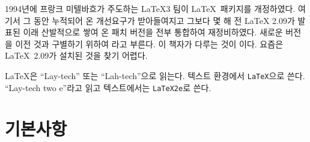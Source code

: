   1994년에 프랑크 미텔바흐가 주도하는 \LaTeX 3
  팀이 \LaTeX\ 패키지를 개정하였다. 여기서 그 동안
  누적되어 온 개선요구가 받아들여지고 그보다 몇 해 전 \LaTeX{} 2.09가 발표된 이래 산발적으로 쌓여 온
  패치 버전을 전부 통합하여 재정비하였다. 새로운 버전을 이전 것과
  구별하기 위하여 \LaTeXe 라고 부른다. 이 책자가
  다루는 것이 \LaTeXe 이다. 요즘은 \LaTeX~2.09가 설치된 것을 찾기 어렵다.

\LaTeX 은 ``Lay-tech'' 또는 ``Lah-tech''으로 읽는다. 텍스트 환경에서 
\texttt{LaTeX}으로 쓴다.  ``Lay-tech two e''라고
 읽고 텍스트에서는 \texttt{LaTeX2e}로 쓴다.


%

\section{기본사항}

